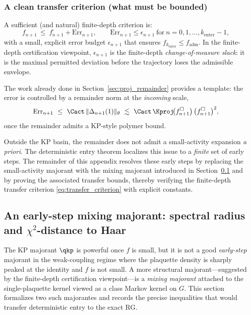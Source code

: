 \subsubsection{A clean transfer criterion (what must be bounded)}

A sufficient (and natural) finite-depth criterion is:
\begin{equation}\label{eq:transfer_criterion}
f_{n+1}\ \le\ f_{n+1}^{\square} + \mathrm{Err}_{n+1},
\qquad
\mathrm{Err}_{n+1}\le \epsilon_{n+1}\ \text{for}\ n=0,1,\dots,k_{\mathrm{enter}}-1,
\end{equation}
with a small, explicit error budget $\epsilon_{n+1}$ that ensures
$f_{k_{\mathrm{enter}}}\le f_{\mathrm{adm}}$.
In the finite-depth certification viewpoint, $\epsilon_{n+1}$ is the finite-depth \emph{change-of-measure slack}:
it is the maximal permitted deviation before the trajectory loses the admissible envelope.

The work already done in Section~\ref{sec:proj_remainder} provides a template:
the error is controlled by a remainder norm at the \emph{incoming} scale,
\begin{equation}\label{eq:error_template}
\mathrm{Err}_{n+1}\ \le\ \Cact\,\|\Delta_{n+1}(1)\|_{\theta}
\ \lesssim\ \Cact\,\Kproj\!\bigl(f_{n+1}^{\square}\bigr)\,\bigl(f_{n+1}^{\square}\bigr)^2,
\end{equation}
once the remainder admits a KP-style polymer bound.

\begin{remark}
Outside the KP basin, the remainder does not admit a small-activity expansion \emph{a priori}.
The deterministic entry theorem localizes this issue to a \emph{finite} set of early steps.
The remainder of this appendix resolves these early steps by replacing the small-activity majorant with
the mixing majorant introduced in Section~\ref{sec:mix_majorant} and by proving the associated transfer bounds,
thereby verifying the finite-depth transfer criterion \eqref{eq:transfer_criterion} with explicit constants.
\end{remark}


\subsection{An early-step mixing majorant: spectral radius and \texorpdfstring{$\chi^2$}{chi2}-distance to Haar}\label{sec:mix_majorant}

The KP majorant $\qkp$ is powerful once $f$ is small, but it is not a good \emph{early-step} majorant
in the weak-coupling regime where the plaquette density is sharply peaked at the identity and $f$ is not small.
A more structural majorant---suggested by the finite-depth certification viewpoint---is a \emph{mixing majorant}
attached to the single-plaquette kernel viewed as a class Markov kernel on $G$.
This section formalizes two such majorantes and records the precise inequalities that would transfer
deterministic entry to the exact RG.


